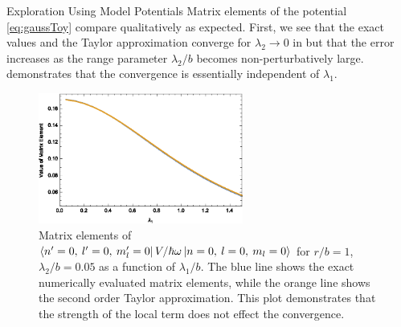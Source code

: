 \begin{section}{Exploration Using Model Potentials\label{sec:toyModel}}
Matrix elements of the potential \eqref{eq:gaussToy} compare qualitatively as expected. First, we see that the exact values and the Taylor approximation converge for $\lambda_2\rightarrow 0$ in  but that the error increases as the range parameter $\lambda_2/b$ becomes non-perturbatively large.  demonstrates that the convergence is essentially independent of $\lambda_1$. 


\begin{figure}[htb]
\centering \includegraphics[width=0.6\textwidth]{LocalExpansion/Figures/ToyPotential000000l1} 
\caption[Matrix elements of the toy potential with varying $\lambda_1$]{Matrix elements of $\braket{n'=0,\: l'=0,\: m_l'=0 |\, V/\hbar\omega \,| n=0,\: l=0,\: m_l=0}$ for $r/b=1$, $\lambda_2/b=0.05$ as a function of $\lambda_1/b$. The blue line shows the exact numerically evaluated matrix elements, while the orange line shows the second order Taylor approximation. This plot demonstrates that the strength of the local term does not effect the convergence.
\label{fig:gaussToy2}}
\end{figure}

\end{section}

